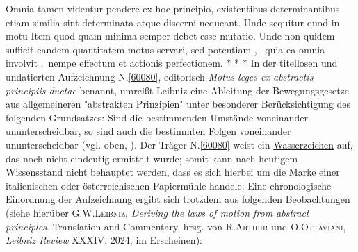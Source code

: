 Omnia tamen videntur pendere
ex hoc principio,
%
existentibus determinantibus%
etiam similia sint determinata%
atque discerni nequeant.%
Unde sequitur
quod in motu
\pend
\pstart%
Item
quod quam minima semper debet esse mutatio.%
Unde non quidem sufficit
eandem quantitatem motus servari,%
sed potentiam%
%
\lbrack,\rbrack\
%
quia ea omnia involvit%
\lbrack,\rbrack\
nempe effectum%
et actionis perfectionem.%
%
\indexS{perfectio actionis}%
\indexS{actio perfecta}
\pend%
\vspace*{6.5em}%
\pstart%
\noindent%
\centering%
*     *     *
\pend%
\newpage%
%
\frenchspacing%
\footnotesize%
\pstart%
\noindent%
%
In der titellosen und undatierten Aufzeichnung N.\;\ref{60080}, editorisch \textit{Motus leges ex abstractis principiis ductae} benannt, umreißt Leibniz eine Ableitung der Bewegungsgesetze aus allgemeineren "abstrakten Prinzipien" unter besonderer Berücksichtigung des folgenden Grundsatzes:
Sind die bestimmenden Umstände voneinander ununterscheidbar, so sind auch die bestimmten Folgen voneinander ununterscheidbar (vgl. oben, ).
Der Träger N.\;\ref{60080} weist ein \href{\Scan{LH_35_10_11_107wz}}{Wasserzeichen} auf, das noch nicht eindeutig ermittelt wurde;
somit kann nach heutigem Wissensstand nicht behauptet werden, dass es sich hierbei um die Marke einer italienischen oder österreichischen Papiermühle handele.
Eine chronologische Einordnung der Aufzeichnung ergibt sich trotzdem aus folgenden Beobachtungen (siehe hierüber \textsc{G.\:W.\;Leibniz}, \textit{Deriving the laws of motion from abstract principles}. Translation and Commentary, hrsg. von \textsc{R.\;Arthur} und \textsc{O.\;Ottaviani}, \textit{Leibniz Review} XXXIV, 2024, im Erscheinen):\cite{02619}
